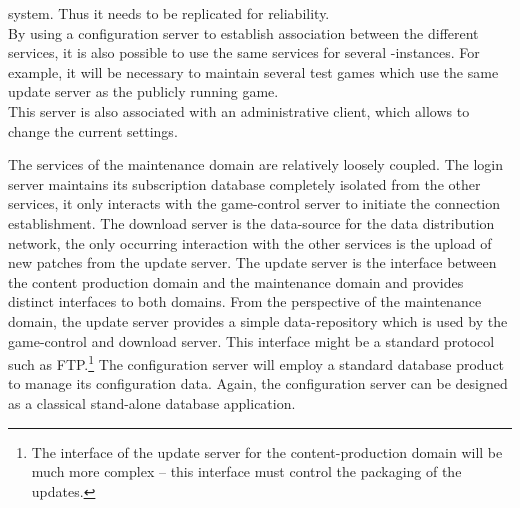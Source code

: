 \documentclass[a4paper, 10pt]{book}
\begin{document}
\begin{description}
                        system. Thus it needs to be replicated for reliability.\\
                        By using a configuration server to establish association between
                        the different services, it is also possible to use the same services
                        for several \MMORG-instances. For example, it will be necessary to
                        maintain several test games which use the same update server as the
                        publicly running game.\\
                        This server is also associated with an administrative client, which
                        allows to change the current settings. 
                \end{description}
                The services of the maintenance domain are relatively loosely coupled.
                The login server maintains its subscription database completely
                isolated from the other services,
                it only interacts with the game-control server to initiate the
                connection establishment. The download server is the data-source for
                the data distribution network, the only occurring interaction with the
                other services is the upload of new patches from the update server.
                The update server is the interface between the content production
                domain and the maintenance domain and provides 
                distinct interfaces to both domains. From the perspective of the 
                maintenance domain,
                the update server provides a simple data-repository which is used by
                the game-control and download server. This interface might be a
                standard protocol such as FTP.\footnote{The interface of the update
                server for the content-production domain will be much more complex
                -- this interface must control the packaging of the updates.}  The
                configuration server will employ a standard database product to manage
                its configuration data.
                Again, the configuration server can be designed as a classical
                stand-alone database application.
\end{document}
